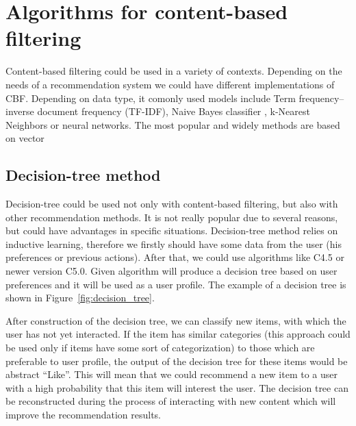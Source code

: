 \section{Algorithms for content-based filtering}\label{sec:cbf_algorithms}
Content-based filtering could be used in a variety of contexts. Depending on the needs of a recommendation system we could have different implementations of CBF. Depending on data type, it comonly used models include Term frequency–inverse document frequency (TF-IDF)\cite{TF_IDF}, Naive Bayes classifier \cite{Naive_classifier}, k-Nearest Neighbors or neural networks. The most popular and widely methods are based on vector 

\subsection{Decision-tree method}
Decision-tree could be used not only with content-based filtering, but also with other recommendation methods. It is not really popular due to several reasons, but could have advantages in specific situations. Decision-tree method relies on inductive learning, therefore we firstly should have some data from the user (his preferences or previous actions). After that, we could use algorithms like C4.5\cite{C4_5} or newer version C5.0. Given algorithm will produce a decision tree based on user preferences and it will be used as a user profile. The example of a decision tree is shown in Figure~\ref{fig:decision_tree}\cite{Decision_Tree}.

After construction of the decision tree, we can classify new items, with which the user has not yet interacted. If the item has similar categories (this approach could be used only if items have some sort of categorization) to those which are preferable to user profile, the output of the decision tree for these items would be abstract “Like”. This will mean that we could recommend a new item to a user with a high probability that this item will interest the user. The decision tree can be reconstructed during the process of interacting with new content which will improve the recommendation results.

